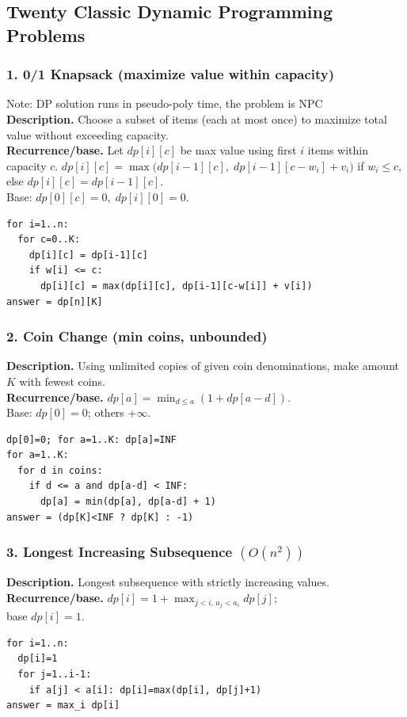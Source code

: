 \documentclass[9pt]{extarticle}
\begin{document}
\subsection{Twenty Classic Dynamic Programming Problems}

\subsubsection{1. 0/1 Knapsack (maximize value within capacity)}
Note: DP solution runs in pseudo-poly time, the problem is NPC\\
\textbf{Description.} Choose a subset of items (each at most once) to maximize total value without exceeding capacity.\\
\textbf{Recurrence/base.} Let \(dp[i][c]\) be max value using first \(i\) items within capacity \(c\).  
\(dp[i][c]=\max\big(dp[i-1][c],\; dp[i-1][c-w_i]+v_i\big)\) if \(w_i\le c\), else \(dp[i][c]=dp[i-1][c]\).  \\
Base: \(dp[0][c]=0,\; dp[i][0]=0\).
\begin{verbatim}
for i=1..n:
  for c=0..K:
    dp[i][c] = dp[i-1][c]
    if w[i] <= c:
      dp[i][c] = max(dp[i][c], dp[i-1][c-w[i]] + v[i])
answer = dp[n][K]
\end{verbatim}

\subsubsection{2. Coin Change (min coins, unbounded)}
\textbf{Description.} Using unlimited copies of given coin denominations, make amount \(K\) with fewest coins.\\
\textbf{Recurrence/base.} \(dp[a]=\min_{d\le a}(1+dp[a-d])\).  \\
Base: \(dp[0]=0\); others \(+\infty\).
\begin{verbatim}
dp[0]=0; for a=1..K: dp[a]=INF
for a=1..K:
  for d in coins:
    if d <= a and dp[a-d] < INF:
      dp[a] = min(dp[a], dp[a-d] + 1)
answer = (dp[K]<INF ? dp[K] : -1)
\end{verbatim}

\subsubsection{3. Longest Increasing Subsequence $(O(n^2))$}
\textbf{Description.} Longest subsequence with strictly increasing values.\\
\textbf{Recurrence/base.} \(dp[i]=1+\max_{j<i,\,a_j<a_i} dp[j]\); \\base \(dp[i]=1\).
\begin{verbatim}
for i=1..n:
  dp[i]=1
  for j=1..i-1:
    if a[j] < a[i]: dp[i]=max(dp[i], dp[j]+1)
answer = max_i dp[i]
\end{verbatim}
\end{document}
